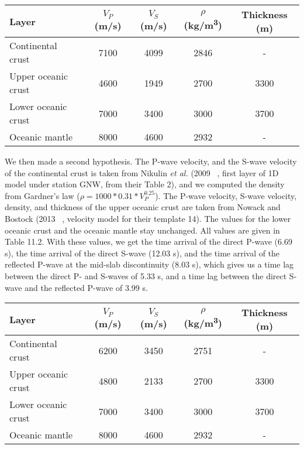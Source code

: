 \documentclass[workdone.tex]{subfiles}
\begin{document}
\begin{center}
\begin{tabular}{| l | c | c | c | c |}
  \hline
  Layer & $V_P$ (m/s) & $V_S$ (m/s) & $\rho$ (kg/m\textsuperscript{3}) & Thickness (m) \\
  \hline
  Continental crust & 7100 & 4099 & 2846 & - \\
  Upper oceanic crust & 4600 & 1949 & 2700 & 3300 \\
  Lower oceanic crust & 7000 & 3400 & 3000 & 3700 \\
  Oceanic mantle & 8000 & 4600 & 2932 & - \\
  \hline
\end{tabular}
\captionsetup{type=table}
\end{center}

We then made a second hypothesis. The P-wave velocity, and the S-wave velocity of the continental crust is taken from Nikulin \textit{et al.} (2009 ~\cite{NIK_2009}, first layer of 1D model under station GNW, from their Table 2), and we computed the density from Gardner's law ($\rho = 1000 * 0.31 * V_P^{0.25}$). The P-wave velocity, S-wave velocity, density, and thickness of the upper oceanic crust are taken from Nowack and Bostock (2013 ~\cite{NOW_2013}, velocity model for their template 14). The values for the lower oceanic crust and the oceanic mantle stay unchanged. All values are given in Table 11.2. With these values, we get the time arrival of the direct P-wave (6.69 s), the time arrival of the direct S-wave (12.03 s), and the time arrival of the reflected P-wave at the mid-slab discontinuity (8.03 s), which gives us a time lag between the direct P- and S-waves of 5.33 s, and a time lag between the direct S-wave and the reflected P-wave of 3.99 s. \\

\begin{center}
\begin{tabular}{| l | c | c | c | c |}
  \hline
  Layer & $V_P$ (m/s) & $V_S$ (m/s) & $\rho$ (kg/m\textsuperscript{3}) & Thickness (m) \\
  \hline
  Continental crust & 6200 & 3450 & 2751 & - \\
  Upper oceanic crust & 4800 & 2133 & 2700 & 3300 \\
  Lower oceanic crust & 7000 & 3400 & 3000 & 3700 \\
  Oceanic mantle & 8000 & 4600 & 2932 & - \\
  \hline
\end{tabular}
\captionsetup{type=table}
\end{center}
\end{document}
